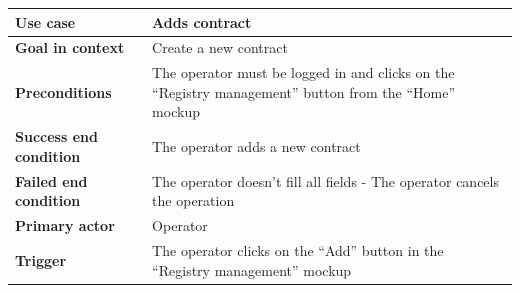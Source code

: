 {{{						\begin{table}[h]
			\begin{tabular}{|p{4cm}|p{10cm}|}
			\hline
				\centering \vspace{1mm} \bfseries{Use case} \vspace{1mm} & 
				\vspace{1mm} Adds contract \vspace{1mm}\\
			\hline
				\centering \vspace{1mm} \bfseries{Goal in context} \vspace{1mm} & 
				\vspace{1mm} Create a new contract \vspace{1mm}\\
			\hline
				\centering \vspace{1mm} \bfseries{Preconditions} \vspace{1mm} & 
				\vspace{1mm} The operator must be logged in and clicks on the “Registry management” button from the “Home” mockup \vspace{1mm}\\
			\hline
				\centering \vspace{1mm} \bfseries{Success end condition} \vspace{1mm} & 
				\vspace{1mm} The operator adds a new contract \vspace{1mm}\\
			\hline
				\centering \vspace{1mm} \bfseries{Failed end condition} \vspace{1mm} & 
				\vspace{1mm} The operator doesn’t fill all fields - The operator cancels the operation \vspace{1mm}\\
			\hline
				\centering \vspace{1mm} \bfseries{Primary actor} \vspace{1mm} & 
				\vspace{1mm} Operator \vspace{1mm}\\
			\hline
				\centering \vspace{1mm} \bfseries{Trigger} \vspace{1mm} & 
				\vspace{1mm} The operator clicks on the “Add” button in the “Registry management” mockup \vspace{1mm}\\
			\hline
			\end{tabular}
			\end{table}

}}}
